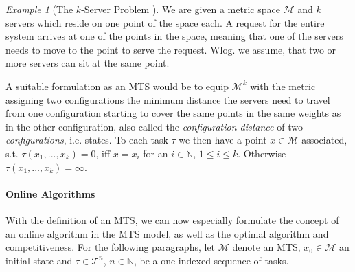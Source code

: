 \documentclass[10pt]{amsart}
\theoremstyle{definition}
\theoremstyle{remark}
\newtheorem{example}[theorem]{Example}
\begin{document}
    \begin{example}[The \(k\)-Server Problem {\cite[pp. 87-88]{Woeginger}}]
        We are given a metric space \(\mathcal{M}\) and \(k\) servers which reside on one point of the space each. A request for the entire system arrives at one of the points in the space, meaning that one of the servers needs to move to the point to serve the request. Wlog. we assume, that two or more servers can sit at the same point.

        \begin{figure}[!hbtp]
            \centering
        \end{figure}

        A suitable formulation as an MTS would be to equip \(\mathcal{M}^k\) with the metric assigning two configurations the minimum distance the servers need to travel from one configuration starting to cover the same points in the same weights as in the other configuration, also called the \emph{configuration distance} of two \emph{configurations}, i.e. states. To each task \(\tau\) we then have a point \(x \in \mathcal{M}\) associated, s.t. \(\tau(x_1, ..., x_k) = 0\), iff \(x = x_i\) for an \(i \in \mathbb{N}\), \(1 \leq i \leq k\). Otherwise \(\tau(x_1, ..., x_k) = \infty\).
    \end{example}

    \paragraph{\textbf{Online Algorithms}} With the definition of an MTS, we can now especially formulate the concept of an online algorithm in the MTS model, as well as the optimal algorithm and competitiveness. For the following paragraphs, let \(\mathcal{M}\) denote an MTS, \(x_0 \in \mathcal{M}\) an initial state and \(\tau \in \mathcal{T}^n\), \(n \in \mathbb{N}\), be a one-indexed sequence of tasks.
\end{document}
